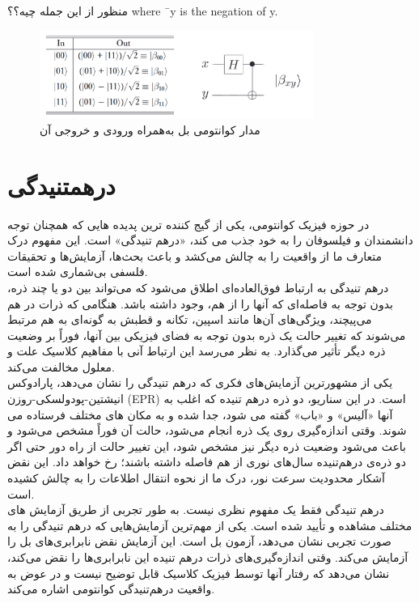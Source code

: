 \documentclass{book}
\begin{document}
منظور از این جمله چیه؟؟
where ¯y is the negation of y.




 
\begin{figure}[h]
	\centering
	\includegraphics[width=0.8\textwidth]{Bell_state.png}
	\caption{مدار کوانتومی بل به‌همراه ورودی و خروجی آن}
\end{figure}

\section{درهمتنیدگی}
در حوزه فیزیک کوانتومی، یکی از گیج کننده ترین پدیده هایی که همچنان توجه دانشمندان و فیلسوفان را به خود جذب می کند، «درهم تنیدگی» است. این مفهوم درک متعارف ما از واقعیت را به چالش می‌کشد و باعث بحث‌ها، آزمایش‌ها و تحقیقات فلسفی بی‌شماری شده است.\\
درهم تنیدگی به ارتباط فوق‌العاده‌ای اطلاق می‌شود که می‌تواند بین دو یا چند ذره، بدون توجه به فاصله‌ای که آنها را از هم، وجود داشته باشد. هنگامی که ذرات در هم می‌پیچند، ویژگی‌های آن‌ها مانند اسپین، تکانه و قطبش به گونه‌ای به هم مرتبط می‌شوند که تغییر حالت یک ذره بدون توجه به فضای فیزیکی بین آنها، فوراً بر وضعیت ذره دیگر تأثیر می‌گذارد. به نظر می‌رسد این ارتباط آنی با مفاهیم کلاسیک علت و معلول مخالفت می‌کند.\\

یکی از مشهورترین آزمایش‌های فکری که درهم تنیدگی را نشان می‌دهد، پارادوکس انیشتین-پودولسکی-روزن (EPR) است. در این سناریو، دو ذره درهم تنیده که اغلب به آنها «آلیس» و «باب» گفته می شود، جدا شده و به مکان های مختلف فرستاده می شوند. وقتی اندازه‌گیری روی یک ذره انجام می‌شود، حالت آن فوراً مشخص می‌شود و باعث می‌شود وضعیت ذره دیگر نیز مشخص شود، این تغییر حالت از راه دور حتی اگر دو ذره‌ی درهم‌تنیده سال‌های نوری از هم فاصله داشته باشند؛ رخ خواهد داد. این نقض آشکار محدودیت سرعت نور، درک ما از نحوه انتقال اطلاعات را به چالش کشیده است.\\

درهم تنیدگی فقط یک مفهوم نظری نیست. به طور تجربی از طریق آزمایش های مختلف مشاهده و تأیید شده است. یکی از مهم‌ترین آزمایش‌هایی که درهم تنیدگی را به صورت تجربی نشان می‌دهد، آزمون بل است.
این آزمایش نقض نابرابری‌های بل را آزمایش می‌کند. وقتی اندازه‌گیری‌های ذرات درهم تنیده این نابرابری‌ها را نقض می‌کند، نشان می‌دهد که رفتار آنها توسط فیزیک کلاسیک قابل توضیح نیست و در عوض به واقعیت درهم‌تنیدگی کوانتومی اشاره می‌کند.\\
\end{document}
